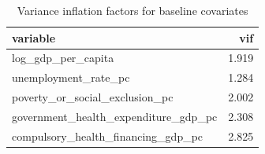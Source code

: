 \begin{table}
\caption{Variance inflation factors for baseline covariates}
\label{tab:regression_vif}
\begin{tabular}{lr}
\toprule
variable & vif \\
\midrule
log\_gdp\_per\_capita & 1.919 \\
unemployment\_rate\_pc & 1.284 \\
poverty\_or\_social\_exclusion\_pc & 2.002 \\
government\_health\_expenditure\_gdp\_pc & 2.308 \\
compulsory\_health\_financing\_gdp\_pc & 2.825 \\
\bottomrule
\end{tabular}
\end{table}
